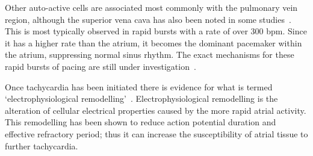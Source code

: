 Other auto-active cells are associated most commonly with the pulmonary vein
region, although the superior vena cava has also been noted in some
studies~\cite{Tsai2000}.
This is most typically observed in rapid bursts with a rate of over 300 bpm.
Since it has a higher rate than the atrium, it becomes the dominant pacemaker
within the atrium, suppressing normal sinus rhythm.
The exact mechanisms for these rapid bursts of pacing are still under
investigation~\cite{Chen2000}.

Once tachycardia has been initiated there is evidence for what is termed
`electrophysiological remodelling'~\cite{Stott2008,Workman2001,Bosch1999}.
Electrophysiological remodelling is the alteration of cellular electrical
properties caused by the more rapid atrial activity.
This remodelling has been shown to reduce action potential duration and
effective refractory period; thus it can increase the susceptibility of atrial
tissue to further tachycardia.



